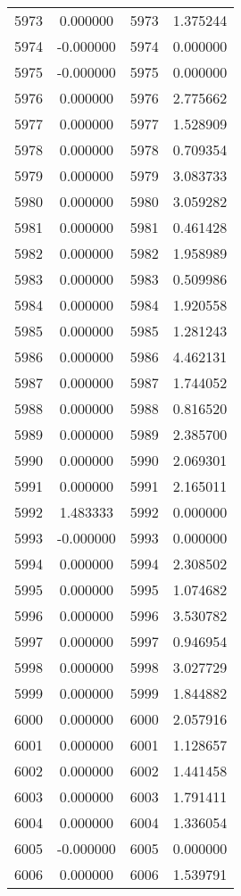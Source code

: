 \documentclass[12pt]{article}
\begin{document}
\begin{longtable}{@{}cccc@{}}
5973 & 0.000000 & 5973 & 1.375244 \\
5974 & -0.000000 & 5974 & 0.000000 \\
5975 & -0.000000 & 5975 & 0.000000 \\
5976 & 0.000000 & 5976 & 2.775662 \\
5977 & 0.000000 & 5977 & 1.528909 \\
5978 & 0.000000 & 5978 & 0.709354 \\
5979 & 0.000000 & 5979 & 3.083733 \\
5980 & 0.000000 & 5980 & 3.059282 \\
5981 & 0.000000 & 5981 & 0.461428 \\
5982 & 0.000000 & 5982 & 1.958989 \\
5983 & 0.000000 & 5983 & 0.509986 \\
5984 & 0.000000 & 5984 & 1.920558 \\
5985 & 0.000000 & 5985 & 1.281243 \\
5986 & 0.000000 & 5986 & 4.462131 \\
5987 & 0.000000 & 5987 & 1.744052 \\
5988 & 0.000000 & 5988 & 0.816520 \\
5989 & 0.000000 & 5989 & 2.385700 \\
5990 & 0.000000 & 5990 & 2.069301 \\
5991 & 0.000000 & 5991 & 2.165011 \\
5992 & 1.483333 & 5992 & 0.000000 \\
5993 & -0.000000 & 5993 & 0.000000 \\
5994 & 0.000000 & 5994 & 2.308502 \\
5995 & 0.000000 & 5995 & 1.074682 \\
5996 & 0.000000 & 5996 & 3.530782 \\
5997 & 0.000000 & 5997 & 0.946954 \\
5998 & 0.000000 & 5998 & 3.027729 \\
5999 & 0.000000 & 5999 & 1.844882 \\
6000 & 0.000000 & 6000 & 2.057916 \\
6001 & 0.000000 & 6001 & 1.128657 \\
6002 & 0.000000 & 6002 & 1.441458 \\
6003 & 0.000000 & 6003 & 1.791411 \\
6004 & 0.000000 & 6004 & 1.336054 \\
6005 & -0.000000 & 6005 & 0.000000 \\
6006 & 0.000000 & 6006 & 1.539791 \\

\end{longtable}
\end{document}
